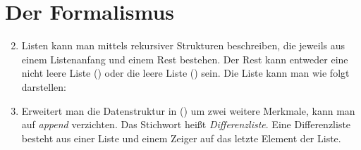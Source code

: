 \begin{enumerate}
\end{enumerate}


\section{Der Formalismus}
\label{Abschnitt-Formalismus-Lösungen}\label{Seite-Lösungen-Listen}

\begin{enumerate}
\setcounter{enumi}{1}
\item Listen kann man mittels rekursiver Strukturen beschreiben, die jeweils aus einem Listenanfang
  und einem Rest bestehen. Der Rest kann entweder eine nicht leere Liste () oder die
  leere Liste () sein. Die Liste  kann man wie folgt darstellen:
\ea
{}
\z
\item\label{page-difflists}
 Erweitert man die Datenstruktur in () um zwei weitere Merkmale, kann man auf
  \emph{append} verzichten. Das Stichwort heißt \emph{Differenzliste}. Eine Differenzliste besteht
  aus einer Liste und einem Zeiger auf das letzte Element der Liste. 
\ea
{}
\z


\end{enumerate}
